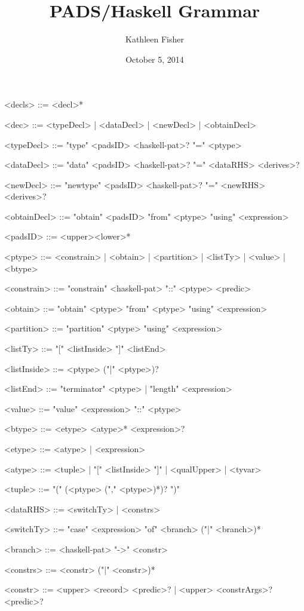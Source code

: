 \documentclass{article}
\title{ PADS/Haskell Grammar}
\author{Kathleen Fisher}
\date{October 5, 2014}
\begin{document}
\maketitle
\thispagestyle{empty}

\begin{grammar}
<decls> ::= <decl>*

<dec>        ::= <typeDecl> | <dataDecl> | <newDecl> | <obtainDecl>

<typeDecl>   ::= "type" <padsID> <haskell-pat>? "=" <ptype>

<dataDecl>   ::= "data" <padsID> <haskell-pat>? "=" <dataRHS> <derives>?

<newDecl>    ::= "newtype" <padsID> <haskell-pat>? "=" <newRHS> <derives>?

<obtainDecl> ::= "obtain" <padsID> "from" <ptype> "using" <expression>

<padsID>     ::= <upper><lower>*

<ptype>      ::= <constrain> | <obtain> | <partition> | <listTy> | <value> | <btype>

<constrain>  ::= "constrain" <haskell-pat> "::" <ptype> <predic>

<obtain>     ::= "obtain" <ptype> "from" <ptype> "using" <expression>

<partition>  ::= "partition" <ptype> "using" <expression>

<listTy>     ::= "[" <listInside> "]" <listEnd>

<listInside> ::= <ptype> ("|" <ptype>)?

<listEnd>    ::= "terminator" <ptype> | "length" <expression>

<value>      ::= "value" <expression> "::" <ptype>

<btype>      ::= <etype> <atype>* <expression>?

<etype>      ::= <atype> | <expression>

<atype>      ::= <tuple> | "[" <listInside> "]" | <qualUpper> | <tyvar>

<tuple>      ::= "(" (<ptype> ("," <ptype>)*)? ")"

<dataRHS>    ::= <switchTy> | <constrs>
 
<switchTy>   ::= "case" <expression> "of" <branch> ("|" <branch>)*

<branch>     ::= <haskell-pat> "->" <constr>

<constrs>    ::= <constr> ("|" <constr>)*

<constr>     ::= <upper> <record> <predic>? | <upper> <constrArgs>? <predic>?


\end{grammar}
\end{document}
